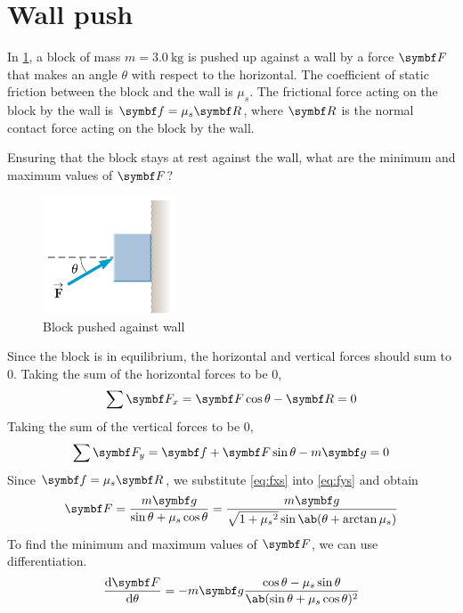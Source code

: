 \section{Wall push}
\begin{problem}
  In \cref{fig:wallpush}, a block of mass \(m = \qty{3.0}{\kg}\) is
  pushed up against a wall by a force
  \(\mv{F}\) that makes an angle \(\theta\) with respect to the horizontal.
  The coefficient of static friction between the block and the wall
  is \(\mu_s\).
  The frictional force acting on the block by the wall is \(\mv{f} =
  \mu_s\mv{R}\),
  where \(\mv{R}\) is the normal contact force acting on the block by the wall.

  Ensuring that the block stays at rest against the wall, what are the minimum
  and maximum values of \(\mv{F}\)?
\end{problem}
\begin{figure}
  \centering
  \includegraphics[width=0.35\textwidth]{assets/wallpush.png}
  \caption{Block pushed against wall}
  \label{fig:wallpush}
\end{figure}
Since the block is in equilibrium, the horizontal and vertical forces should
sum to \(0\).
Taking the sum of the horizontal forces to be \(0\),
\begin{equation}
  \sum\mv{F}_x=\mv{F}\cos\theta-\mv{R}= 0
  \label{eq:fxs}
\end{equation}
Taking the sum of the vertical forces to be \(0\),
\begin{equation}
  \sum\mv{F}_y = \mv{f} + \mv{F}\sin\theta - m\mv{g} = 0
  \label{eq:fys}
\end{equation}
Since \(\mv{f} = \mu_s\mv{R}\), we substitute \cref{eq:fxs} into
\cref{eq:fys} and obtain
\begin{equation}
  \mv{F} = \f{m\mv{g}}{\sin\theta+\mu_s\cos\theta} =
  \f{m\mv{g}}{\sqrt{1+{\mu_s}^2}\sin\ab(\theta+\arctan\mu_s)}
  \label{eq:fmus}
\end{equation}
To find the minimum and maximum values of \(\mv{F}\), we can use
differentiation.
\begin{equation}
  \odv{\mv{F}}{\theta} =
  -m\mv{g}\f{\cos\theta-\mu_s\sin\theta}{\ab(\sin\theta+\mu_s\cos\theta)^2}
  \label{eq:dfd0}
\end{equation}
